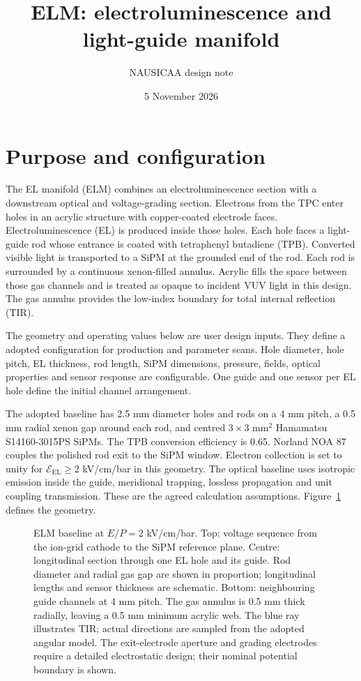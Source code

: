 \documentclass[11pt,a4paper]{article}
\title{ELM: electroluminescence and light-guide manifold}
\author{NAUSICAA design note}
\date{5 November 2026}
\newcommand{\EP}{\mathcal{E}_{\mathrm{EL}}}
\begin{document}
\maketitle

\section{Purpose and configuration}
The EL manifold (ELM) combines an electroluminescence section with a downstream
optical and voltage-grading section. Electrons from the TPC enter holes in an
acrylic structure with copper-coated electrode faces. Electroluminescence (EL)
is produced inside those holes. Each hole faces a light-guide rod whose entrance
is coated with tetraphenyl butadiene (TPB). Converted visible light is transported
to a SiPM at the grounded end of the rod. Each rod is surrounded by a continuous
xenon-filled annulus. Acrylic fills the space between those gas channels and
is treated as opaque to incident VUV light in this design. The gas annulus
provides the low-index boundary for total internal reflection (TIR).

The geometry and operating values below are user design inputs. They define a
adopted configuration for production and parameter scans. Hole diameter, hole
pitch, EL thickness, rod length, SiPM dimensions, pressure, fields, optical
properties and sensor response are configurable. One guide and one sensor per
EL hole define the initial channel arrangement.

The adopted baseline has 2.5 mm diameter holes and rods on a 4 mm pitch,
a 0.5 mm radial xenon gap around each rod, and centred $3\times3$ mm$^2$
Hamamatsu S14160-3015PS SiPMs. The TPB conversion efficiency is 0.65. Norland NOA 87 couples the
polished rod exit to the SiPM window. Electron collection is set to unity
for $\EP\geq2$ kV/cm/bar in this geometry. The optical baseline uses isotropic
emission inside the guide, meridional trapping, lossless propagation and
unit coupling transmission. These are the agreed calculation assumptions.
Figure~\ref{fig:elm} defines the geometry.

\begin{figure}[p]
\centering
\resizebox{\linewidth}{!}{}
\caption{ELM baseline at $E/P=2$ kV/cm/bar. Top: voltage sequence from the
ion-grid cathode to the SiPM reference plane. Centre: longitudinal section
through one EL hole and its guide. Rod diameter and radial gas gap are
shown in proportion; longitudinal lengths and sensor thickness are schematic. Bottom: neighbouring guide channels
at 4 mm pitch. The gas annulus is 0.5 mm thick radially, leaving a 0.5 mm
minimum acrylic web. The blue ray illustrates TIR; actual directions are
sampled from the adopted angular model. The exit-electrode aperture and
grading electrodes require a detailed electrostatic design; their nominal
potential boundary is shown.}
\label{fig:elm}
\end{figure}
\end{document}
